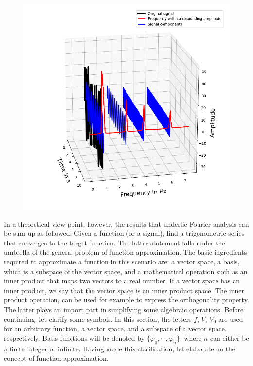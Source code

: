 \documentclass[../Main/thesis.tex]{subfiles}
\begin{document}
\begin{figure}[H] %
   \centering
   \includegraphics[width=6in]{../fig/fft_domain} 
   \caption{}
   \label{fig:fft_domain}
\end{figure}
\justify
In a theoretical view point, however, the results that underlie Fourier analysis can be sum up as followed: Given a function (or a signal), find a trigonometric series that converges to the target function. The latter statement falls under the umbrella of the general problem of function approximation.  
\justify
The basic ingredients required to approximate a function in this scenario are: a vector space, a basis, which is a subspace of the vector space, and a mathematical operation such as an inner product that maps two vectors to a real number. If a vector space has an inner product, we say that the vector space is an inner product space. The inner product operation, can be used for example to express the orthogonality property. The latter plays an import part in simplifying some algebraic operations.
\justify
Before continuing, let clarify some symbols. In this section, the letters $f$, $V$, $V_{0}$ are used for an arbitrary function, a vector space, and a subspace of a vector space, respectively.
Basis functions will be denoted by $\{  \varphi_{0}, \cdots,\varphi_{n}\}$, where $n$ can either be a finite integer or infinite. Having made this clarification, let elaborate on the concept of function approximation. 
\end{document}
